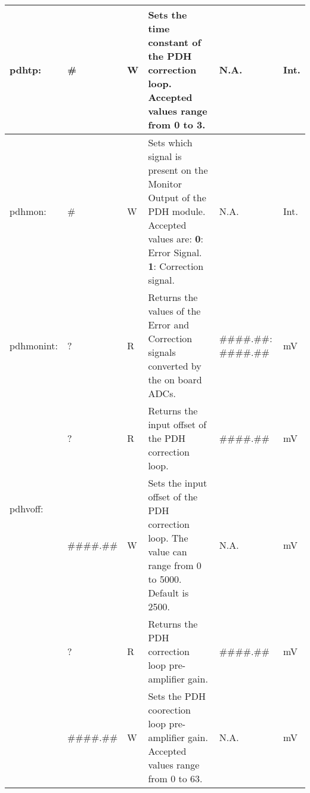 \begin{center}
\begin{longtable}{| m{} | m{} | m{} | m{} | m{}| m{} |}
    pdhtp: & \# & W & Sets the time constant of the PDH correction loop. Accepted values range from 0 to 3. & N.A. & Int. \\
    \hline
    
    pdhmon: & \# & W & Sets which signal is present on the Monitor Output of the PDH module. Accepted values are:
                \newline \textbf{0}: Error Signal.
                \newline \textbf{1}: Correction signal. & N.A. & Int. \\
    \hline
    
    pdhmonint: & ? & R & Returns the values of the Error and Correction signals converted by the on board ADCs. & \#\#\#\#.\#\#: \#\#\#\#.\#\# & mV \\
    \hline
    
    
    \multirow{2}{0.1\textwidth}{pdhvoff:}    & ? & R & Returns the input offset of the PDH correction loop. &  \#\#\#\#.\#\# & mV \\
                                            \cline{2-6}
                                            &  \#\#\#\#.\#\#  & W & Sets the input offset of the PDH correction loop. The value can range from 0 to 5000. Default is 2500. & N.A. & mV\\
    \hline
    
    \newpage
    
    \hline
    
    \multirow{2}{0.1\textwidth}{pdhdp:}    & ? & R & Returns the PDH correction loop pre-amplifier gain. &  \#\#\#\#.\#\# & mV \\
                                            \cline{2-6}
                                            &  \#\#\#\#.\#\#  & W & Sets the PDH coorection loop pre-amplifier gain. Accepted values range from 0 to 63. & N.A. & mV\\
    \hline
    
    \end{longtable}
\end{center}

\newpage





